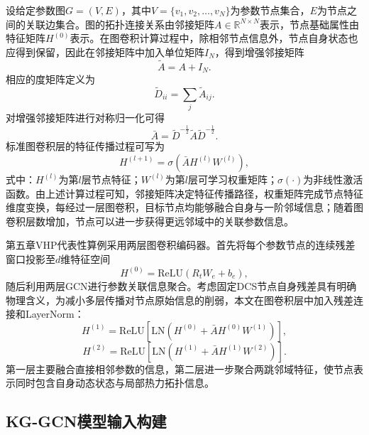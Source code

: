 设给定参数图$G=(V,E)$，其中$V=\{v_1,v_2,\ldots,v_N\}$为参数节点集合，$E$为节点之间的关联边集合。图的拓扑连接关系由邻接矩阵$A\in\mathbb{R}^{N\times N}$表示，节点基础属性由特征矩阵$H^{(0)}$表示。在图卷积计算过程中，除相邻节点信息外，节点自身状态也应得到保留，因此在邻接矩阵中加入单位矩阵$I_N$，得到增强邻接矩阵
\begin{equation}
\tilde A=A+I_N .
\end{equation}
相应的度矩阵定义为
\begin{equation}
\tilde D_{ii}=\sum_j\tilde A_{ij} .
\end{equation}
对增强邻接矩阵进行对称归一化可得
\begin{equation}
\bar A=\tilde D^{-\frac{1}{2}}\tilde A\tilde D^{-\frac{1}{2}} .
\end{equation}
标准图卷积层的特征传播过程可写为
\begin{equation}
H^{(l+1)}=\sigma\left(\bar A H^{(l)}W^{(l)}\right),
\end{equation}
式中：$H^{(l)}$为第$l$层节点特征；$W^{(l)}$为第$l$层可学习权重矩阵；$\sigma(\cdot)$为非线性激活函数。由上述计算过程可知，邻接矩阵决定特征传播路径，权重矩阵完成节点特征维度变换，每经过一层图卷积，目标节点均能够融合自身与一阶邻域信息；随着图卷积层数增加，节点可以进一步获得更远邻域中的关联参数信息。

第五章VHP代表性算例采用两层图卷积编码器。首先将每个参数节点的连续残差窗口投影至$d$维特征空间
\begin{equation}
H^{(0)}=\mathrm{ReLU}(R_tW_e+b_e),
\end{equation}
随后利用两层GCN进行参数关联信息聚合。考虑固定DCS节点自身残差具有明确物理含义，为减小多层传播对节点原始信息的削弱，本文在图卷积层中加入残差连接和LayerNorm：
\begin{equation}
H^{(1)}=\mathrm{ReLU}\left[\mathrm{LN}\left(H^{(0)}+\bar A H^{(0)}W^{(1)}\right)\right],
\end{equation}
\begin{equation}
H^{(2)}=\mathrm{ReLU}\left[\mathrm{LN}\left(H^{(1)}+\bar A H^{(1)}W^{(2)}\right)\right].
\end{equation}
第一层主要融合直接相邻参数的信息，第二层进一步聚合两跳邻域特征，使节点表示同时包含自身动态状态与局部热力拓扑信息。


\subsection{KG-GCN模型输入构建}
\label{subsec:kg_input_v5}

